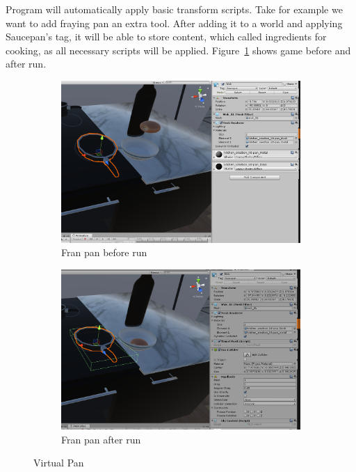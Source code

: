 \documentclass[18pt]{article}
\numberwithin{equation}{section} %
\numberwithin{figure}{section} %
\numberwithin{table}{section} %
\begin{document}
		Program will automatically apply basic transform scripts. Take for example we want to add fraying pan an extra tool. After adding it to a world and applying Saucepan's tag, it will be able to store content, which called ingredients for cooking, as all necessary scripts will be applied. Figure~\ref{fig:add_franpan} shows game before and after run. \\
		
		\begin{figure}[H]
			\centering
			\begin{subfigure}{0.45\textwidth}
				\centering
				\includegraphics[width=1\linewidth]{images/franpan}
				\caption{Fran pan before run}
			\end{subfigure}
			\begin{subfigure}{0.45\textwidth}
				\centering
				\includegraphics[width=1\linewidth]{images/franpan_script}
				\caption{Fran pan after run}
			\end{subfigure}		
			\caption{Virtual Pan}
			\label{fig:add_franpan}
		\end{figure}
		
\end{document}
